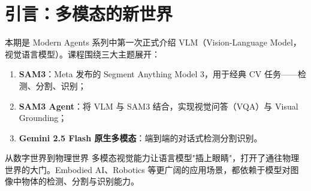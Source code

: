 \section{引言：多模态的新世界}

本期是 Modern Agents 系列中第一次正式介绍 VLM（Vision-Language Model，视觉语言模型）。课程围绕三大主题展开：

\begin{enumerate}
    \item \textbf{SAM3}：Meta 发布的 Segment Anything Model 3，用于经典 CV 任务——检测、分割、识别；
    \item \textbf{SAM3 Agent}：将 VLM 与 SAM3 结合，实现视觉问答（VQA）与 Visual Grounding；
    \item \textbf{Gemini 2.5 Flash 原生多模态}：端到端的对话式检测分割识别。
\end{enumerate}

\begin{knowledgebox}{从数字世界到物理世界}
多模态视觉能力让语言模型"插上眼睛"，打开了通往物理世界的大门。Embodied AI、Robotics 等更广阔的应用场景，都依赖于模型对图像中物体的检测、分割与识别能力。
\end{knowledgebox}

